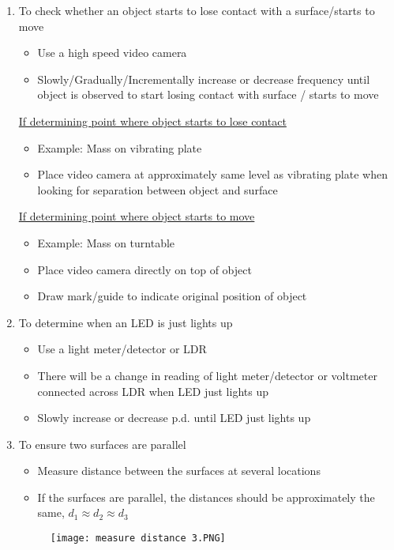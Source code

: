\documentclass{article}
\begin{document}
\begin{enumerate}
\item To check whether an object starts to lose contact with a surface/starts to move 
\begin{itemize}
    \item 	Use a high speed video camera
\item	Slowly/Gradually/Incrementally increase or decrease frequency until object is observed to start losing contact with surface / starts to move

\end{itemize}
\underline{If determining point where object starts to lose contact}
\begin{itemize}
    \item Example: Mass on vibrating plate
\item	Place video camera at approximately same level as vibrating plate when looking for separation between object and surface
\end{itemize}
\underline{If determining point where object starts to move}
\begin{itemize}
    \item 	Example: Mass on turntable
\item	Place video camera directly on top of object
\item	Draw mark/guide to indicate original position of object

\end{itemize}

\item To determine when an LED is just lights up
\begin{itemize}
    \item 	Use a light meter/detector or LDR
\item	There will be a change in reading of light meter/detector or voltmeter connected across LDR when LED just lights up
\item	Slowly increase or decrease p.d. until LED just lights up
\end{itemize}

\item To ensure two surfaces are parallel
\begin{itemize}
    \item Measure distance between the surfaces at several locations
\item	If the surfaces are parallel, the distances should be approximately the same, $d_1\approx d_2 \approx d_3$
\end{itemize}
\begin{figure}[H]
    \centering
    \texttt{[image: measure distance 3.PNG]}
\end{figure}

\end{enumerate}
\end{document}
